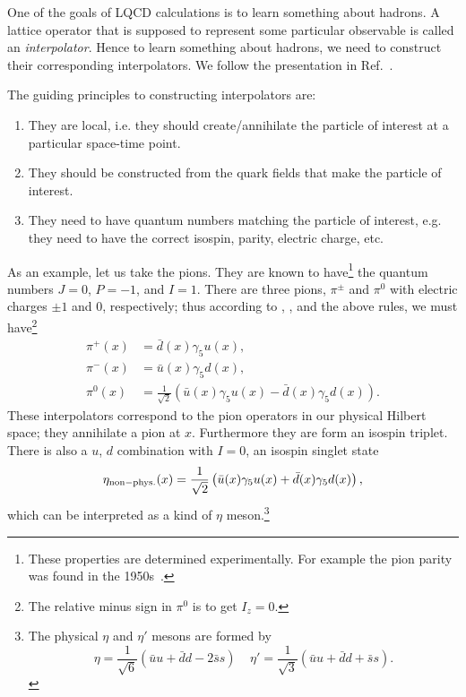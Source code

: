 One of the goals of LQCD calculations is to learn something about hadrons. A
lattice operator that is supposed to represent some particular observable is
called an {\it interpolator}. Hence to learn something
about hadrons, we need to construct their corresponding interpolators. We follow
the presentation in Ref.~\cite{gattringer_quantum_2010}.

The guiding principles to constructing interpolators are:
\begin{enumerate}
  \item They are local, i.e. they should create/annihilate the particle of
        interest at a particular space-time point.
  \item They should be constructed from the quark fields that make the particle
        of interest.
  \item They need to have quantum numbers matching the particle of interest,
        e.g. they need to have the correct isospin, parity, electric charge,
        etc.
\end{enumerate} 
As an example, let us take the pions. They are known to
have\footnote{These properties are determined experimentally. For
example the pion parity was found in the 1950s~\cite{chinowsky_reaction_1955}.} 
the quantum numbers $J=0$, $P=-1$, and $I=1$. There are three
pions, $\pi^{\pm}$ and $\pi^0$ with electric charges $\pm1$ and 0,
respectively; thus according to ,
, and the above rules, we must have\footnote{The relative
minus sign in $\pi^0$ is to get $I_z=0$.}
\begin{equation}\begin{aligned}
  \pi^+(x) &= \bar{d}(x)\gamma_5u(x),\\
  \pi^-(x) &= \bar{u}(x)\gamma_5d(x),\\
  \pi^0(x) &= \frac{1}{\sqrt{2}}\left( \bar{u}(x)\gamma_5u(x)
                                      -\bar{d}(x)\gamma_5d(x)\right).
\end{aligned}\end{equation}
These interpolators correspond to the pion operators in our physical Hilbert
space; they annihilate a pion at $x$. Furthermore they are form an
isospin triplet. There is also a $u$, $d$ combination
with $I=0$, an isospin singlet state
\begin{equation}
\eta_{\rm non-phys.}(x)= \frac{1}{\sqrt{2}}\left( \bar{u}(x)\gamma_5u(x)
                                      +\bar{d}(x)\gamma_5d(x)\right),
\end{equation}
which can be interpreted as a kind of $\eta$ 
meson.\footnote{The physical $\eta$ and $\eta'$ mesons are formed by 
$$
\eta= \frac{1}{\sqrt{6}}\left( \bar{u}u+\bar{d}d-2\bar{s}s\right)~~~~~
\eta'= \frac{1}{\sqrt{3}}\left( \bar{u}u+\bar{d}d+\bar{s}s\right).
$$
}


